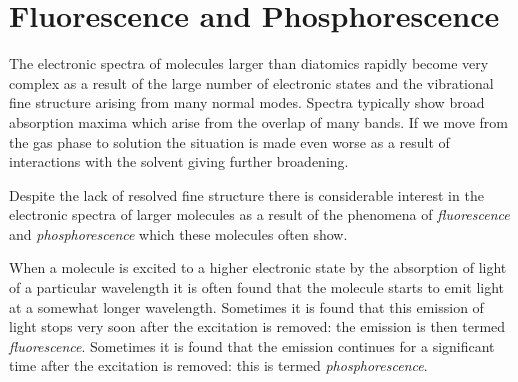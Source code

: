 \documentclass{article}
\theoremstyle{plain}\theoremheaderfont{\normalfont\itshape}\theorembodyfont{\rmfamily}\theoremseparator{.}\newtheorem*{rem}{Remark}\newtheorem*{ex}{Example}\newtheorem*{proof}{Proof}\newtheorem*{altp}{Alternative proof}
\theoremstyle{plain}\theoremheaderfont{\normalfont\bfseries}\theorembodyfont{\rmfamily}\theoremseparator{.}\newtheorem{thm}{Theorem}[section]\newtheorem{lem}[thm]{Lemma}\newtheorem{prop}[thm]{Proposition}\newtheorem*{cor}{Corollary}\newtheorem{defn}[thm]{Definition}\newtheorem{clm}[thm]{Claim}\newtheorem{clminproof}{Claim}\newtheorem{pos}{Postulate}[section]
\theoremstyle{break}\theoremheaderfont{\normalfont\itshape}\theorembodyfont{\rmfamily}\theoremseparator{.\medskip}\newtheorem*{proofskip}{Proof}\newtheorem*{exs}{Examples}\newtheorem*{rems}{Remarks}
\theoremstyle{break}\theoremheaderfont{\normalfont\bfseries}\theorembodyfont{\rmfamily}\theoremseparator{.\medskip}\newtheorem{lemskip}[thm]{Lemma}\newtheorem{defnskip}[thm]{Definition}\newtheorem{propskip}[thm]{Proposition}\newtheorem{thmskip}[thm]{Theorem}
\numberwithin{equation}{section}
\begin{document}
    \newpage

    \section{Fluorescence and Phosphorescence}
    The electronic spectra of molecules larger than diatomics rapidly become very complex as a result of the large number of electronic states and the vibrational fine structure arising from many normal modes. Spectra typically show broad absorption maxima which arise from the overlap of many bands. If we move from the gas phase to solution the situation is made even worse as a result of interactions with the solvent giving further broadening.

    Despite the lack of resolved fine structure there is considerable interest in the electronic spectra of larger molecules as a result of the phenomena of \textit{fluorescence} and \textit{phosphorescence} which these molecules often show.
    
    When a molecule is excited to a higher electronic state by the absorption of light of a particular wavelength it is often found that the molecule starts to emit light at a somewhat longer wavelength. Sometimes it is found that this emission of light stops very soon after the excitation is removed: the emission is then termed \textit{fluorescence}. Sometimes it is found that the emission continues for a significant time after the excitation is removed: this is termed \textit{phosphorescence}.
\end{document}

